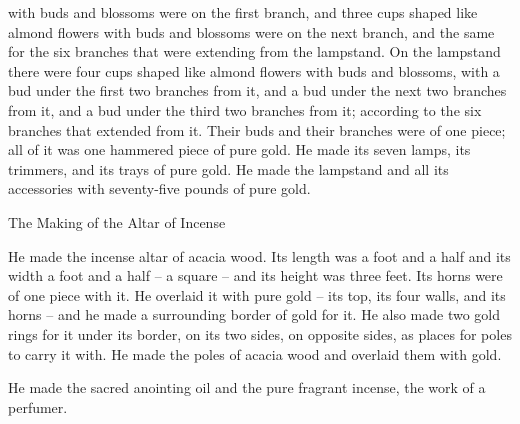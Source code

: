 {with buds
and blossoms
were on the first branch, and three
cups
shaped like almond
flowers
with buds
and blossoms
were on the next branch, and the same
for the six
branches
that were extending
from
the lampstand.
On the lampstand
there were four
cups
shaped like almond
flowers with buds
and blossoms,
with a bud
under
the first two
branches
from
it, and a bud
under
the next two
branches
from
it, and a bud
under
the third two
branches
from
it; according
to the six
branches
that extended
from it.
Their buds
and their branches
were of one piece;
all
of it was one
hammered
piece of pure
gold.
He made
its seven
lamps,
its trimmers,
and its trays
of pure
gold.
He made
the lampstand and all
its accessories
with seventy-five pounds
of pure
gold.
\par }{\SH The Making of the Altar of Incense
\par }{\PP {}He made
the incense
altar
of acacia
wood.
Its length
was a foot and a half
and its width
a foot and a half
– a square
– and its height
was three feet.
Its horns were of one piece with it.
He overlaid
it with pure
gold
– its
top,
its four walls,
and its horns
– and he made
a surrounding
border
of gold
for it.
He also made
two
gold
rings
for it under
its border,
on
its two
sides,
on
opposite sides,
as places
for poles
to carry it with.
He made
the poles
of acacia
wood
and overlaid
them with gold.
\par }{\PP {}He made
the sacred
anointing
oil
and the pure
fragrant
incense,
the work
of a perfumer.

}
